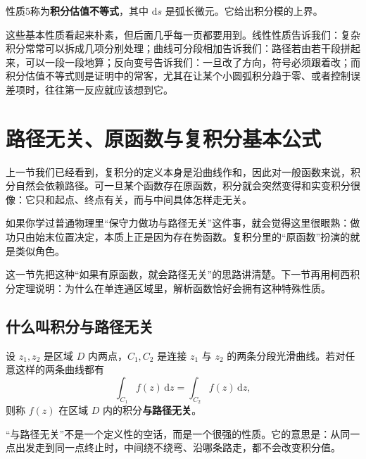 \begin{zhu}{}{}
性质5称为\textbf{积分估值不等式}，其中 $\mathrm{d}s$ 是弧长微元。它给出积分模的上界。
\end{zhu}

\begin{tishi}
这些基本性质看起来朴素，但后面几乎每一页都要用到。线性性质告诉我们：复杂积分常常可以拆成几项分别处理；曲线可分段相加告诉我们：路径若由若干段拼起来，可以一段一段地算；反向变号告诉我们：一旦改了方向，符号必须跟着改；而积分估值不等式则是证明中的常客，尤其在让某个小圆弧积分趋于零、或者控制误差项时，往往第一反应就应该想到它。
\end{tishi}

\section{路径无关、原函数与复积分基本公式}

\begin{wulibj}[为什么这里先谈路径无关]
上一节我们已经看到，复积分的定义本身是沿曲线作和，因此对一般函数来说，积分自然会依赖路径。可一旦某个函数存在原函数，积分就会突然变得和实变积分很像：它只和起点、终点有关，而与中间具体怎样走无关。

如果你学过普通物理里``保守力做功与路径无关''这件事，就会觉得这里很眼熟：做功只由始末位置决定，本质上正是因为存在势函数。复积分里的``原函数''扮演的就是类似角色。

这一节先把这种``如果有原函数，就会路径无关''的思路讲清楚。下一节再用柯西积分定理说明：为什么在单连通区域里，解析函数恰好会拥有这种特殊性质。
\end{wulibj}

\subsection{什么叫积分与路径无关}

设 $z_1,z_2$ 是区域 $D$ 内两点，$C_1,C_2$ 是连接 $z_1$ 与 $z_2$ 的两条分段光滑曲线。若对任意这样的两条曲线都有
\[
    \int_{C_1} f(z)\,\mathrm{d}z = \int_{C_2} f(z)\,\mathrm{d}z,
\]
则称 $f(z)$ 在区域 $D$ 内的积分\textbf{与路径无关}。

\begin{zhu}{}{}
``与路径无关''不是一个定义性的空话，而是一个很强的性质。它的意思是：从同一点出发走到同一点终止时，中间绕不绕弯、沿哪条路走，都不会改变积分值。
\end{zhu}


